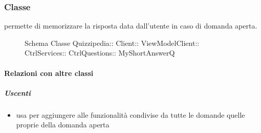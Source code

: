 \subsubsection{Classe }
permette di memorizzare la risposta data dall'utente in caso di domanda aperta.
\begin{figure}[H]
\centering
\noindent{}
\caption[Schema Classe MyShortAnswerQ]{Schema Classe Quizzipedia:: Client:: ViewModelClient:: CtrlServices:: CtrlQuestions:: MyShortAnswerQ}
\end{figure}
\paragraph{Relazioni con altre classi}
\subparagraph{Uscenti}
\begin{itemize}
\item usa  per aggiungere alle funzionalità condivise da tutte le domande quelle proprie della domanda aperta
\end{itemize}
